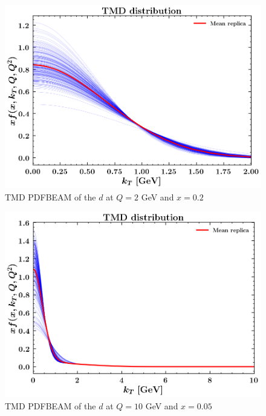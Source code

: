 \documentclass[]{article}
\begin{document}
\begin{figure}
\centering
\includegraphics{pngplots/tmd_1_2_0.2.png}
\caption{TMD PDFBEAM of the \(d\) at \(Q = 2\) GeV and \(x = 0.2\)}
\end{figure}

\begin{figure}
\centering
\includegraphics{pngplots/tmd_1_10_0.05.png}
\caption{TMD PDFBEAM of the \(d\) at \(Q = 10\) GeV and \(x = 0.05\)}
\end{figure}
\end{document}
